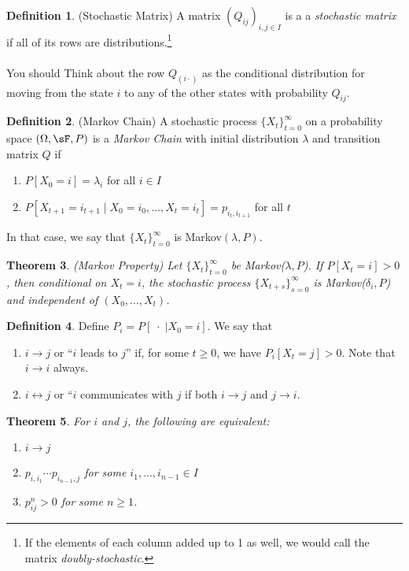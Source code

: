 \documentclass[12pt]{article}
\theoremstyle{plain}
\newtheorem{thm}{Theorem}[section]
\theoremstyle{definition}
\newtheorem{defn}[thm]{Definition}
\theoremstyle{remark}
\newcommand{\ra}{\rightarrow}
\newcommand{\tinfz}{_{t=0}^\infty}
\begin{document}
\begin{defn}(Stochastic Matrix)
A matrix $(Q_{ij})_{i,j\in I}$ is a a \emph{stochastic matrix} if all of
its rows are distributions.\footnote{%
  If the elements of each column added up to 1 as well, we would call
  the matrix {\sl doubly-stochastic}.
}
\\
\\
You should Think about the row $Q_{(i\cdot)}$ as the conditional
distribution for moving from the state $i$ to any of the other states
with probability $Q_{ij}$.
\end{defn}

\begin{defn}(Markov Chain)
A stochastic process $\{X_t\}\tinfz$ on a probability space
$(\Omega,\sF,P)$ is a \emph{Markov Chain} with initial distribution
$\lambda$ and transition matrix $Q$ if
\begin{enumerate}[label=(\roman*)]
  \item $P[X_0=i]=\lambda_i$ for all $i\in I$
  \item $P[X_{t+1} = i_{t+1} \; | \; X_0=i_0, \ldots, X_t=i_t]
    = p_{i_t,i_{t+1}}$ for all $t$
\end{enumerate}
In that case, we say that $\{X_t\}\tinfz$ is Markov$(\lambda,P)$.
\end{defn}

\begin{thm}\emph{(Markov Property)}
Let $\{X_t\}\tinfz$ be Markov($\lambda,P$). If $P[X_t=i]>0$, then
conditional on $X_t=i$, the stochastic process
$\{X_{t+s}\}_{s=0}^\infty$ is Markov($\delta_i,P$) and independent of
$(X_0,\ldots,X_t)$.
\end{thm}

\begin{defn}
Define $P_i = P[\;\cdot \;| X_0=i]$.
We say that
\begin{enumerate}[label=(\roman*)]
  \item $i\ra j$ or ``$i$ leads to $j$'' if, for some $t\geq 0$, we have
    $P_i[X_t = j]>0$. Note that $i\ra i$ always.
  \item $i\leftrightarrow j$ or ``$i$ communicates with $j$ if both
    $i\ra j$ and $j\ra i$.
\end{enumerate}
\end{defn}

\begin{thm}
For $i$ and $j$, the following are equivalent:
\begin{enumerate}
  \item $i\ra j$
  \item $p_{i,i_1}\cdots p_{i_{n-1},j}$ for some
    $i_1,\ldots,i_{n-1}\in I$
  \item $p^n_{ij}> 0$ for some $n\geq 1$.
\end{enumerate}
\end{thm}
\end{document}
